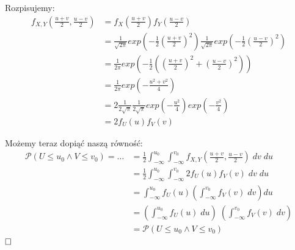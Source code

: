 Rozpisujemy:
\begin{align*}
	f_{X,Y}\left(\frac{u+v}{2}, \frac{u-v}{2}\right)
	 & = f_{X}\left(\frac{u+v}{2}\right) f_{Y}\left(\frac{u-v}{2}\right)                                                                                                 \\
	 & = \frac{1}{\sqrt{2\pi}} exp\left(-\frac{1}{2} \left(\frac{u+v}{2}\right)^2\right) \frac{1}{\sqrt{2\pi}} exp\left(-\frac{1}{2} \left(\frac{u-v}{2}\right)^2\right) \\
	 & = \frac{1}{2\pi} exp\left( -\frac{1}{2} \left( \left( \frac{u+v}{2}\right)^2 + \left( \frac{u-v}{2}\right)^2 \right) \right)                                      \\
	 & = \frac{1}{2\pi} exp\left( - \frac{u^2 + v^2}{4} \right)                                                                                                          \\
	 & = 2 \frac{1}{2\sqrt{\pi}} \frac{1}{2\sqrt{\pi}} exp\left( - \frac{u^2}{4} \right) exp\left( - \frac{v^2}{4} \right)                                               \\
	 & = 2 f_U(u) f_V(v)
\end{align*}

Możemy teraz dopiąć naszą równość:
\begin{align*}
	\mathcal{P}(U \le u_0 \land V \le v_0) = \dots & = \frac{1}{2} \int_{-\infty}^{u_0} \int_{-\infty}^{v_0} f_{X,Y}\left(\frac{u+v}{2}, \frac{u-v}{2}\right) \; dv \; du \\
	                                               & = \frac{1}{2} \int_{-\infty}^{u_0} \int_{-\infty}^{v_0} 2 f_U(u) f_V(v) \; dv \; du                                  \\
	                                               & = \int_{-\infty}^{u_0} f_U(u) \left( \int_{-\infty}^{v_0} f_V(v) \; dv \right) du                                    \\
	                                               & = \left( \int_{-\infty}^{u_0} f_U(u) \; du \right) \; \left( \int_{-\infty}^{v_0} f_V(v) \; dv \right)               \\
	                                               & = \mathcal{P}(U \le u_0 \land V \le v_0)
\end{align*}
\(\hfill \square\)
